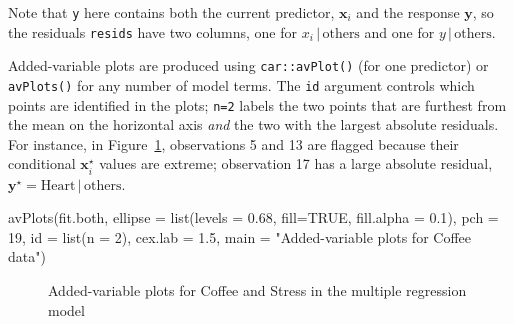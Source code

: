 \documentclass[
  letterpaper,
  10pt,
  krantz2]{krantz}
\makeatletter
\newenvironment{Shaded}{\begin{snugshade}}{\end{snugshade}}
\newcommand{\AttributeTok}[1]{\textcolor[rgb]{0.40,0.45,0.13}{#1}}
\newcommand{\ConstantTok}[1]{\textcolor[rgb]{0.56,0.35,0.01}{#1}}
\newcommand{\DecValTok}[1]{\textcolor[rgb]{0.68,0.00,0.00}{#1}}
\newcommand{\FloatTok}[1]{\textcolor[rgb]{0.68,0.00,0.00}{#1}}
\newcommand{\FunctionTok}[1]{\textcolor[rgb]{0.28,0.35,0.67}{#1}}
\newcommand{\NormalTok}[1]{\textcolor[rgb]{0.00,0.23,0.31}{#1}}
\newcommand{\StringTok}[1]{\textcolor[rgb]{0.13,0.47,0.30}{#1}}
\newenvironment{kframe}{%
  \medskip{}
  \setlength{\fboxsep}{.8em}
  \def\at@end@of@kframe{}%
  \ifinner\ifhmode%
  \def\at@end@of@kframe{\end{minipage}}%
  \begin{minipage}{\columnwidth}%
  \fi\fi%
  \def\FrameCommand##1{\hskip\@totalleftmargin \hskip-\fboxsep
  \colorbox{shadecolor}{##1}\hskip-\fboxsep
      \hskip-\linewidth \hskip-\@totalleftmargin \hskip\columnwidth}%
  \MakeFramed {\advance\hsize-\width
    \@totalleftmargin\z@ \linewidth\hsize
    \@setminipage}}%
{\par\unskip\endMakeFramed%
  \at@end@of@kframe}
\renewenvironment{Shaded}{\begin{kframe}}{\end{kframe}}
\makeatother
\begin{document}
Note that \texttt{y} here contains both the current predictor,
\(\mathbf{x}_i\) and the response \(\mathbf{y}\), so the residuals
\texttt{resids} have two columns, one for
\(x_i \,\vert\, \text{others}\) and one for
\(y \,\vert\, \text{others}\).

Added-variable plots are produced using \texttt{car::avPlot()} (for one
predictor) or \texttt{avPlots()} for any number of model terms. The
\texttt{id} argument controls which points are identified in the plots;
\texttt{n=2} labels the two points that are furthest from the mean on
the horizontal axis \emph{and} the two with the largest absolute
residuals. For instance, in Figure~\ref{fig-coffee-avPlots},
observations 5 and 13 are flagged because their conditional
\(\mathbf{x}_i^\star\) values are extreme; observation 17 has a large
absolute residual,
\(\mathbf{y}^\star = \text{Heart} \,\vert\, \text{others}\).

\begin{Shaded}
\begin{Highlighting}[]
\FunctionTok{avPlots}\NormalTok{(fit.both,}
  \AttributeTok{ellipse =} \FunctionTok{list}\NormalTok{(}\AttributeTok{levels =} \FloatTok{0.68}\NormalTok{, }\AttributeTok{fill=}\ConstantTok{TRUE}\NormalTok{, }\AttributeTok{fill.alpha =} \FloatTok{0.1}\NormalTok{),}
  \AttributeTok{pch =} \DecValTok{19}\NormalTok{,}
  \AttributeTok{id =} \FunctionTok{list}\NormalTok{(}\AttributeTok{n =} \DecValTok{2}\NormalTok{),}
  \AttributeTok{cex.lab =} \FloatTok{1.5}\NormalTok{,}
  \AttributeTok{main =} \StringTok{"Added{-}variable plots for Coffee data"}\NormalTok{)}
\end{Highlighting}
\end{Shaded}

\begin{figure}[H]


\caption{\label{fig-coffee-avPlots}Added-variable plots for Coffee and
Stress in the multiple regression model}

\end{figure}%
\end{document}
